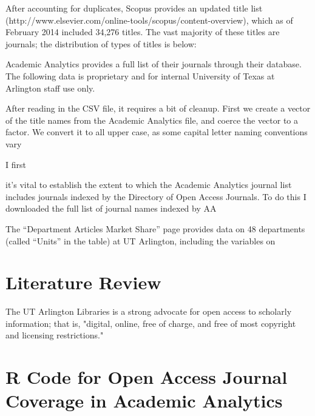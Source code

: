 \documentclass{article}
\begin{document}
After accounting for duplicates, 
Scopus provides an updated title list (http://www.elsevier.com/online-tools/scopus/content-overview), which as of February 2014 included 34,276 titles. 
The vast majority of these titles are journals; the distribution of types of titles is below:




Academic Analytics provides a full list of their journals through their database. 
The following data is proprietary and for internal University of Texas at Arlington staff use only.



After reading in the CSV file, it requires a bit of cleanup. First we create a vector of the title names from the Academic Analytics file, and coerce the vector to a factor. We convert it to all upper case, as some capital letter naming conventions vary 



I first 



it's vital to establish the extent to which the Academic Analytics journal list includes journals indexed by the Directory of Open Access Journals. To do this I downloaded the full list of journal names indexed by AA





The “Department Articles Market Share” page provides data on 48 departments (called “Units” in the table) at UT Arlington, including the variables on 





\section{Literature Review}
The UT Arlington Libraries is a strong advocate for open access to scholarly information; that is, "digital, online, free of charge, and free of most copyright and licensing restrictions."  \cite{RefWorks:102}













\appendix
\section{R Code for Open Access Journal Coverage in Academic Analytics}
\end{document}
